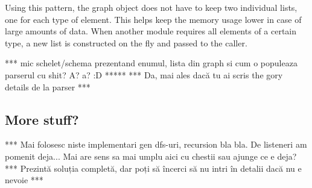 Using this pattern, the graph object does not have to keep two individual lists, one for each type of element. This 
helps keep the memory usage lower in case of large amounts of data. When another module requires all elements of a 
certain type, a new list is constructed on the fly and passed to the caller.

*** mic schelet/schema prezentand enumul, lista din graph si cum o populeaza parserul cu shit? A? a? :D *****
*** Da, mai ales dacă tu ai scris the gory details de la parser *** 

\subsection{More stuff?}

*** Mai folosesc niste implementari gen dfs-uri, recursion bla bla. De listeneri am pomenit deja... Mai are sens sa mai 
umplu aici cu chestii sau ajunge ce e deja?
*** Prezintă soluția completă, dar poți să încerci să nu intri în detalii dacă nu e nevoie ***
